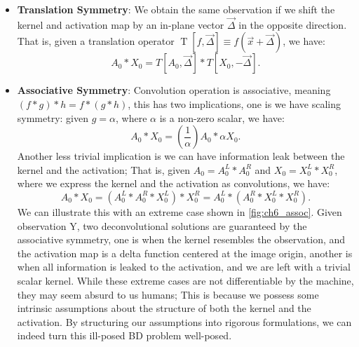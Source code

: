 \begin{itemize}
	\item \textbf{Translation Symmetry}: We obtain the same observation if we shift the kernel and activation map by an in-plane vector $\vec{\Delta}$ in the opposite direction. That is, given a translation operator $\operatorname{T}[f,\vec{\Delta}] \equiv f(\vec{x}+\vec{\Delta})$, we have:  
	\begin{equation}
		A_0 * X_0 = T[A_0,\vec{\Delta}] * T[X_0, -\vec{\Delta}].
	\end{equation}
	\item \textbf{Associative Symmetry}: Convolution operation is associative, meaning $(f * g) * h = f * (g *h)$, this has two implications, one is we have scaling symmetry: given $g = \alpha$, where $\alpha$ is a non-zero scalar, we have: 
	\begin{equation}
		A_0 * X_0 = (\frac{1}{\alpha})A_0*\alpha X_0.
	\end{equation}
	Another less trivial implication is we can have information leak between the kernel and the activation; That is, given $A_0 = A_0^L * A_0^R$ and $X_0= X_0^L * X_0^R$, where we express the kernel and the activation as convolutions, we have: 
	\begin{equation}
		A_0 * X_0 = (A_0^L * A_0^R * X_0^L) * X_0^R = A_0^L * (A_0^R * X_0^L * X_0^R).
	\end{equation}
	We can illustrate this with an extreme case shown in \ref{fig:ch6_assoc}. Given observation Y, two deconvolutional solutions are guaranteed by the associative symmetry, one is when the kernel resembles the observation, and the activation map is a delta function centered at the image origin, another is when all information is leaked to the activation, and we are left with a trivial scalar kernel. While these extreme cases are not differentiable by the machine, they may seem absurd to us humans; This is because we possess some intrinsic assumptions about the structure of both the kernel and the activation. By structuring our assumptions into rigorous formulations, we can indeed turn this ill-posed \ac{BD} problem well-posed. 
	
\end{itemize}



